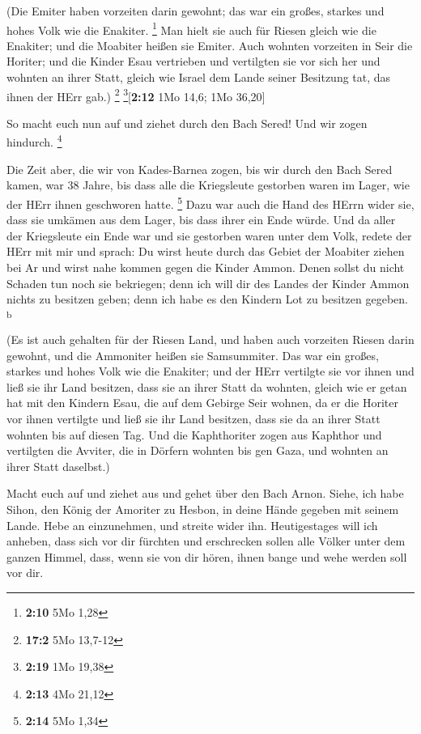  (Die Emiter haben vorzeiten darin gewohnt; das war ein
großes, starkes und hohes Volk wie die Enakiter. \footnote{\textbf{2:10}
  5Mo 1,28}  Man hielt sie auch für Riesen gleich wie die
Enakiter; und die Moabiter heißen sie Emiter.  Auch
wohnten vorzeiten in Seir die Horiter; und die Kinder Esau vertrieben
und vertilgten sie vor sich her und wohnten an ihrer Statt, gleich wie
Israel dem Lande seiner Besitzung tat, das ihnen der HErr gab.)
\footnote{\textbf{17:2} 5Mo 13,7-12} \footnote{\textbf{2:19} 1Mo 19,38}{[}\textbf{2:12}
1Mo 14,6; 1Mo 36,20{]}

 So macht euch nun auf und ziehet durch den Bach Sered!
Und wir zogen hindurch. \footnote{\textbf{2:13} 4Mo 21,12}

 Die Zeit aber, die wir von Kades-Barnea zogen, bis wir
durch den Bach Sered kamen, war 38 Jahre, bis dass alle die Kriegsleute
gestorben waren im Lager, wie der HErr ihnen geschworen hatte.
\footnote{\textbf{2:14} 5Mo 1,34}  Dazu war auch die Hand
des HErrn wider sie, dass sie umkämen aus dem Lager, bis dass ihrer ein
Ende würde.  Und da aller der Kriegsleute ein Ende war
und sie gestorben waren unter dem Volk,  redete der HErr
mit mir und sprach:  Du wirst heute durch das Gebiet der
Moabiter ziehen bei Ar  und wirst nahe kommen gegen die
Kinder Ammon. Denen sollst du nicht Schaden tun noch sie bekriegen; denn
ich will dir des Landes der Kinder Ammon nichts zu besitzen geben; denn
ich habe es den Kindern Lot zu besitzen gegeben. \textsuperscript{b}

 (Es ist auch gehalten für der Riesen Land, und haben
auch vorzeiten Riesen darin gewohnt, und die Ammoniter heißen sie
Samsummiter.  Das war ein großes, starkes und hohes Volk
wie die Enakiter; und der HErr vertilgte sie vor ihnen und ließ sie ihr
Land besitzen, dass sie an ihrer Statt da wohnten, 
gleich wie er getan hat mit den Kindern Esau, die auf dem Gebirge Seir
wohnen, da er die Horiter vor ihnen vertilgte und ließ sie ihr Land
besitzen, dass sie da an ihrer Statt wohnten bis auf diesen Tag.
 Und die Kaphthoriter zogen aus Kaphthor und vertilgten
die Avviter, die in Dörfern wohnten bis gen Gaza, und wohnten an ihrer
Statt daselbst.)

 Macht euch auf und ziehet aus und gehet über den Bach
Arnon. Siehe, ich habe Sihon, den König der Amoriter zu Hesbon, in deine
Hände gegeben mit seinem Lande. Hebe an einzunehmen, und streite wider
ihn.  Heutigestages will ich anheben, dass sich vor dir
fürchten und erschrecken sollen alle Völker unter dem ganzen Himmel,
dass, wenn sie von dir hören, ihnen bange und wehe werden soll vor dir.

